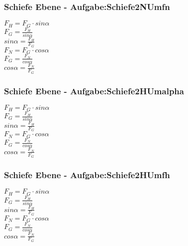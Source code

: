 \subsubsection{Schiefe Ebene - Aufgabe:Schiefe2NUmfn} 
\begin{minipage}{0.45\textwidth} 
$ F_{H}  = F_{G} \cdot sin \alpha $\\ 
$ F_{G}  = \frac{ F_{H} }{sin \alpha } $\\ 
$ sin \alpha  = \frac{F_{H} }{F_{G} } $\\ 
$ F_{N}  = F_{G} \cdot cos \alpha $\\ 
$ F_{G}  = \frac{ F_{N} }{cos \alpha } $\\ 
$ cos \alpha  = \frac{F_{N} }{F_{G} } $\\ 
\end{minipage} 
\begin{minipage}{0.45\textwidth} 
 
\end{minipage} 
\subsubsection{Schiefe Ebene - Aufgabe:Schiefe2HUmalpha} 
\begin{minipage}{0.45\textwidth} 
$ F_{H}  = F_{G} \cdot sin \alpha $\\ 
$ F_{G}  = \frac{ F_{H} }{sin \alpha } $\\ 
$ sin \alpha  = \frac{F_{H} }{F_{G} } $\\ 
$ F_{N}  = F_{G} \cdot cos \alpha $\\ 
$ F_{G}  = \frac{ F_{N} }{cos \alpha } $\\ 
$ cos \alpha  = \frac{F_{N} }{F_{G} } $\\ 
\end{minipage} 
\begin{minipage}{0.45\textwidth} 
 
\end{minipage} 
\subsubsection{Schiefe Ebene - Aufgabe:Schiefe2HUmfh} 
\begin{minipage}{0.45\textwidth} 
$ F_{H}  = F_{G} \cdot sin \alpha $\\ 
$ F_{G}  = \frac{ F_{H} }{sin \alpha } $\\ 
$ sin \alpha  = \frac{F_{H} }{F_{G} } $\\ 
$ F_{N}  = F_{G} \cdot cos \alpha $\\ 
$ F_{G}  = \frac{ F_{N} }{cos \alpha } $\\ 
$ cos \alpha  = \frac{F_{N} }{F_{G} } $\\ 
\end{minipage} 
\begin{minipage}{0.45\textwidth} 
 
\end{minipage} 
